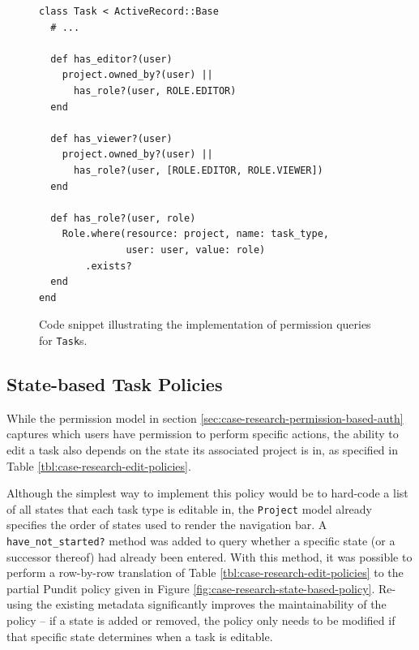 \documentclass[document.tex]{subfiles}
\begin{document}
\begin{figure}[!ht]
  \begin{lstlisting}
class Task < ActiveRecord::Base
  # ...

  def has_editor?(user)
    project.owned_by?(user) ||
      has_role?(user, ROLE.EDITOR)
  end

  def has_viewer?(user)
    project.owned_by?(user) ||
      has_role?(user, [ROLE.EDITOR, ROLE.VIEWER])
  end

  def has_role?(user, role)
    Role.where(resource: project, name: task_type,
               user: user, value: role)
        .exists?
  end
end
  \end{lstlisting}
  \cprotect\caption{Code snippet illustrating the implementation of permission queries for \verb!Task!s.}
  \label{fig:case-research-permission-code-example}
\end{figure}

\FloatBarrier

\subsection {State-based Task Policies}
\label{sec:research-state-based-policies}


While the permission model in section \ref{sec:case-research-permission-based-auth} captures which users have permission to perform specific actions, the ability to edit a task also depends on the state its associated project is in, as specified in Table \ref{tbl:case-research-edit-policies}.

Although the simplest way to implement this policy would be to hard-code a list of all states that each task type is editable in, the \verb!Project! model already specifies the order of states used to render the navigation bar.
A \verb!have_not_started?! method was added to query whether a specific state (or a successor thereof) had already been entered.
With this method, it was possible to perform a row-by-row translation of Table \ref{tbl:case-research-edit-policies} to the partial Pundit policy given in Figure \ref{fig:case-research-state-based-policy}.
Re-using the existing metadata significantly improves the maintainability of the policy -- if a state is added or removed, the policy only needs to be modified if that specific state determines when a task is editable.
\end{document}

